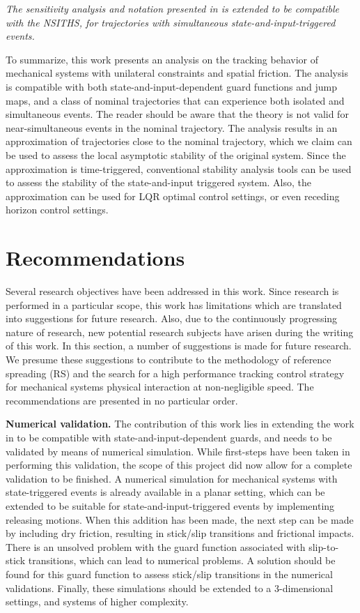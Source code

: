 \documentclass[../DC2019003Bouma.tex]{subfiles}
\begin{document}
\textit{The sensitivity analysis and notation presented in \textnormal{\cite{Rijnen2018a}} is extended to be compatible with the NSITHS, for trajectories with simultaneous state-and-input-triggered events.}

To summarize, this work presents an analysis on the tracking behavior of mechanical systems with unilateral constraints and spatial friction. The analysis is compatible with both state-and-input-dependent guard functions and jump maps, and a class of nominal trajectories that can experience both isolated and simultaneous events. The reader should be aware that the theory is not valid for near-simultaneous events in the nominal trajectory. The analysis results in an approximation of trajectories close to the nominal trajectory, which we claim can be used to assess the local asymptotic stability of the original system. Since the approximation is time-triggered, conventional stability analysis tools can be used to assess the stability of the state-and-input triggered system. Also, the approximation can be used for LQR optimal control settings, or even receding horizon control settings.

\section{Recommendations}\label{sec:6rec}
Several research objectives have been addressed in this work. Since research is performed in a particular scope, this work has limitations which are translated into suggestions for future research. Also, due to the continuously progressing nature of research, new potential research subjects have arisen during the writing of this work. In this section, a number of suggestions is made for future research. We presume these suggestions to contribute to the methodology of reference spreading (RS) and the search for a high performance tracking control strategy for mechanical systems physical interaction at non-negligible speed. The recommendations are presented in no particular order.

\textbf{Numerical validation.} The contribution of this work lies in extending the work in \cite{Rijnen2018a} to be compatible with state-and-input-dependent guards, and needs to be validated by means of numerical simulation. While first-steps have been taken in performing this validation, the scope of this project did now allow for a complete validation to be finished. A numerical simulation for mechanical systems with state-triggered events is already available in a planar setting, which can be extended to be suitable for state-and-input-triggered events by implementing releasing motions. When this addition has been made, the next step can be made by including dry friction, resulting in stick/slip transitions and frictional impacts. There is an unsolved problem with the guard function associated with slip-to-stick transitions, which can lead to numerical problems. A solution should be found for this guard function to assess stick/slip transitions in the numerical validations. Finally, these simulations should be extended to a 3-dimensional settings, and systems of higher complexity.
\end{document}
